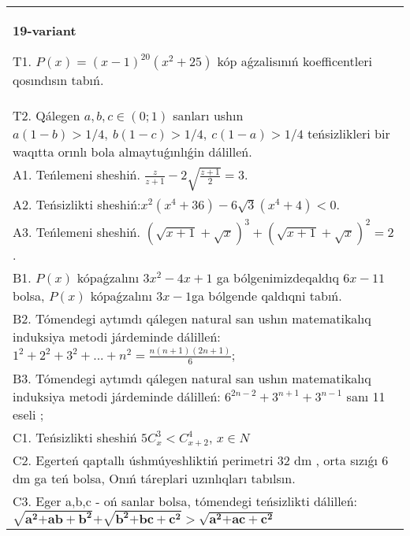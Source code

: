 \documentclass{article}
\begin{document}
\begin{tabular}{m{17cm}}
\textbf{19-variant}
\newline

T1. \(P(x) = (x - 1)^{20}\left( x^{2} + 25 \right)\) kóp aǵzalisınıń koefficentleri qosındısın tabıń. \\
T2. Qálegen \(a,b,c \in (0;1)\) sanları ushın \(a(1 - b) > 1/4,\ b(1 - c) > 1/4,\ c(1 - a) > 1/4\) teńsizlikleri bir waqıtta orınlı bola almaytuǵınlıǵin dálilleń. \\
A1. Teńlemeni sheshiń. \(\frac{z}{z + 1} - 2\sqrt{\frac{z + 1}{2}} = 3\). \\
A2. Teńsizlikti sheshiń:\(x^{2}\left( x^{4} + 36 \right) - 6\sqrt{3}\left( x^{4} + 4 \right) < 0\). \\
A3. Teńlemeni sheshiń. \((\sqrt{x + 1} + \sqrt{x})^{3} + (\sqrt{x + 1} + \sqrt{x})^{2} = 2\). \\
B1. \(P(x)\) kópaǵzalını \(3x^{2} - 4x + 1\) ga bólgenimizdeqaldıq \(6x - 11\) bolsa, \(P(x)\) kópaǵzalını \(3x - 1\)ga bólgende qaldıqni tabıń. \\
B2. Tómendegi aytımdı qálegen natural san ushın matematikalıq induksiya metodi járdeminde dálilleń: \(1^{2} + 2^{2} + 3^{2} + ... + n^{2} = \frac{n(n + 1)(2n + 1)}{6}\); \\
B3. Tómendegi aytımdı qálegen natural san ushın matematikalıq induksiya metodi járdeminde dálilleń: \(6^{2n - 2} + 3^{n + 1} + 3^{n - 1}\) sanı 11 eseli ; \\
C1. Teńsizlikti sheshiń \(5C_{x}^{3} < C_{x + 2}^{4}\), \(x \in N\) \\
C2. Egerteń qaptallı úshmúyeshliktiń perimetri 32 dm , orta sızıǵı 6 dm ga teń bolsa, Onıń táreplari uzınlıqları tabılsın. \\
C3. Eger a,b,c - oń sanlar bolsa, tómendegi teńsizlikti dálilleń: \(\sqrt{\mathbf{a}^{\mathbf{2}}\mathbf{+ ab +}\mathbf{b}^{\mathbf{2}}}\mathbf{+}\sqrt{\mathbf{b}^{\mathbf{2}}\mathbf{+ bc +}\mathbf{c}^{\mathbf{2}}}\mathbf{>}\sqrt{\mathbf{a}^{\mathbf{2}}\mathbf{+ ac +}\mathbf{c}^{\mathbf{2}}}\) \\

\end{tabular}
\vspace{1cm}
\end{document}
